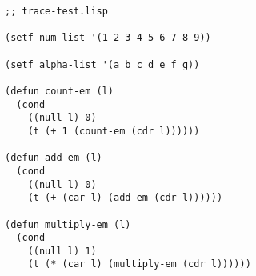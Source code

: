 \documentclass{article}
\begin{document}
\lstset{language=Lisp,numbers=left,keepspaces=false,basicstyle=\small,numberstyle=\tiny,breaklines=true,showstringspaces=false}
\begin{lstlisting}
;; trace-test.lisp

(setf num-list '(1 2 3 4 5 6 7 8 9))

(setf alpha-list '(a b c d e f g))

(defun count-em (l)
  (cond
    ((null l) 0)
    (t (+ 1 (count-em (cdr l))))))

(defun add-em (l)
  (cond
    ((null l) 0)
    (t (+ (car l) (add-em (cdr l))))))

(defun multiply-em (l)
  (cond
    ((null l) 1)
    (t (* (car l) (multiply-em (cdr l))))))
\end{lstlisting}
\end{document}
